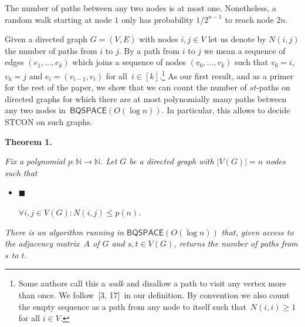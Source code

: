\documentclass[10pt,a4paper]{article}
\begin{document}
The number of paths between any two nodes is at most one. Nonetheless, a random walk starting at node $1$ only has probability $1/2^{n-1}$ to reach node $2n$.\par




Given a directed graph $G=(V,E)$ with nodes $i,j\in V$ let us denote by $N(i,j)$ the number of paths from $i$ to $j$. By a path from $i$ to $j$ we mean a sequence of edges $(e_{1},...,e_{k})$ which joins a sequence of nodes $(v_{0},...,v_{k})$ such that $v_{0}=i$, $v_{k}=j$ and $e_{i}=(v_{i-1},v_{i})$ for all $i\in[k]$.\footnote{Some authors call this a \emph{walk} and disallow a path to visit any vertex more than once. We follow [3, 17] in our definition. By convention we also count the empty sequence as a path from any node to itself such that $N(i,i)\geq 1$ for all $i\in V$.}
As our first result, and as a primer for the rest of the paper, we show that we can count the number of $st$-paths on directed graphs for which there are at most polynomially many paths between any two nodes in $\mathsf{BQSPACE}(O(\log n))$. In particular, this allows to decide $\mathrm{STCON}$ on such graphs.\par





\par\medskip\noindent\textbf{
\textbf{Theorem 1}\textbf{.}
}\par



\emph{Fix a polynomial $p:\mathbb{N}\rightarrow\mathbb{N}$.
Let $G$ be a directed graph with $|V(G)|=n$ nodes such that}\par


\begin{itemize}


\item[] 
$\blacksquare$ 


$\forall i,j\in V(G):N(i,j)\leq p(n)$\emph{.}\par





\end{itemize}


\emph{There is an algorithm running in $\mathsf{BQSPACE}(O(\log n))$ that, given access to the adjacency matrix $A$ of $G$ and $s,t\in V(G)$, returns the number of paths from $s$ to $t$.}\par
\end{document}

